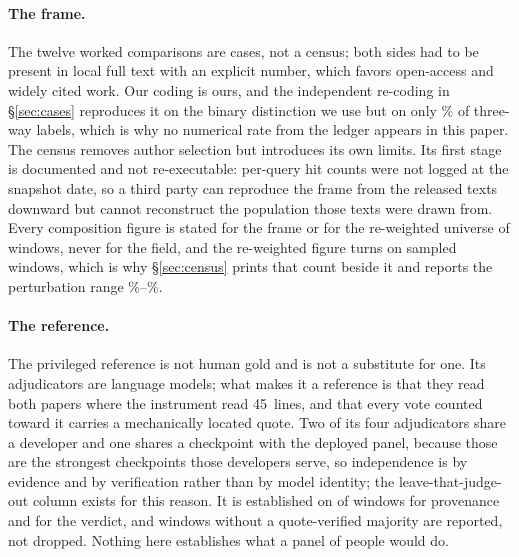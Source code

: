 \documentclass[11pt]{article}
\begin{document}
\paragraph{The frame.}
The twelve worked comparisons are cases, not a census; both sides had to be
present in local full text with an explicit number, which favors open-access and
widely cited work. Our coding is ours, and the independent re-coding in
\S\ref{sec:cases} reproduces it on the binary distinction we use but on only
\RecThreeWayPct\% of three-way labels, which is why no numerical rate from the
ledger appears in this paper. The census removes author selection but introduces
its own limits. Its first stage is documented and not re-executable: per-query
hit counts were not logged at the snapshot date, so a third party can reproduce
the frame from the \FlowTexts{} released texts downward but cannot reconstruct
the population those texts were drawn from. Every composition figure is stated
for the frame or for the re-weighted universe of \RecUniverse{} windows, never
for the field, and the re-weighted figure turns on \RecTransEligN{} sampled
windows, which is why \S\ref{sec:census} prints that count beside it and reports
the perturbation range \RecPerturbDouble\%--\RecPerturbAll\%.

\paragraph{The reference.}
The privileged reference is not human gold and is not a substitute for one. Its
adjudicators are language models; what makes it a reference is that they read
both papers where the instrument read \mbox{45 lines}, and that every vote
counted toward it carries a mechanically located quote. Two of its four
adjudicators share a developer and one shares a checkpoint with the deployed
panel, because those are the strongest checkpoints those developers serve, so
independence is by evidence and by verification rather than by model identity;
the leave-that-judge-out column exists for this reason. It is established on
\RefPvN{} of \PrivN{} windows for provenance and \RefVdN{} for the verdict, and
windows without a quote-verified majority are reported, not dropped. Nothing here
establishes what a panel of people would do.
\end{document}
